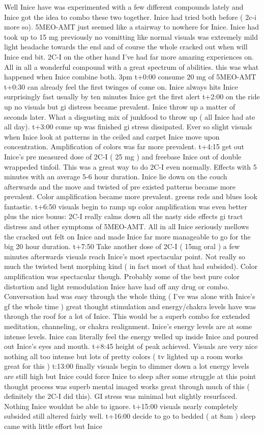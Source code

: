 \documentclass[12pt]{book}
\begin{document}
Well Inice have was experimented with a few different compounds lately and Inice got the idea to combo these two together. Inice had tried both before ( 2c-i more so). 5MEO-AMT just seemed like a stairway to nowhere for Inice. Inice had took up to 15 mg previously no vomitting like normal visuals was extremely mild light headache towards the end and of course the whole cracked out when will Inice end bit. 2C-I on the other hand I've had far more amazing experiences on. All in all a wonderful compound with a great spectrum of abilities. this was what happened when Inice combine both. 3pm t+0:00 consume 20 mg of 5MEO-AMT t+0:30 can already feel the first twinges of come on. Inice always hits Inice surprisingly fast usually by ten minutes Inice get the first alert t+2:00 on the ride up no visuals but gi distress became prevalent. Inice throw up a matter of seconds later. What a disgusting mix of junkfood to throw up ( all Inice had ate all day). t+3:00 come up was finished gi stress dissipated. Ever so slight visuals when Inice look at patterns in the ceiled and carpet Inice move upon concentration. Amplification of colors was far more prevalent. t+4:15 get out Inice's pre measured dose of 2C-I ( 25 mg ) and freebase Inice out of double wrappeded tinfoil. This was a great way to do 2C-I even normally. Effects with 5 minutes with an average 5-6 hour duration. Inice lie down on the couch afterwards and the move and twisted of pre existed patterns became more prevalent. Color amplification became more prevalent. greens reds and blues look fantastic. t+6:50 visuals begin to ramp up color amplification was even better plus the nice bonus: 2C-I really calms down all the nasty side effects gi tract distress and other symptoms of 5MEO-AMT. All in all Inice seriously mellows the cracked out felt on Inice and made Inice far more manageable to go for the big 20 hour duration. t+7:50 Take another dose of 2C-I ( 15mg oral ) a few minutes afterwards visuals reach Inice's most spectacular point. Not really so much the twisted bent morphing kind ( in fact most of that had subsided). Color amplification was spectacular though. Probably some of the best pure color distortion and light remodulation Inice have had off any drug or combo. Conversation had was easy through the whole thing ( I've was alone with Inice's gf the whole time ) great thought stimulation and energy/chakra levels have was through the roof for a lot of Inice. This would be a superb combo for extended meditation, channeling, or chakra realignment. Inice's energy levels are at some intense levels. Inice can literally feel the energy welled up inside Inice and poured out Inice's eyes and mouth. t+8:45 height of peak achieved. Visuals are very nice nothing all too intense but lots of pretty colors ( tv lighted up a room works great for this ) t:13:00 finally visuals begin to dimmer down a lot energy levels are still high but Inice could force Inice to sleep after some struggle at this point thought process was superb mental imaged works great through much of this ( definitely the 2C-I did this). GI stress was minimal but slightly resurfaced. Nothing Inice wouldnt be able to ignore. t+15:00 visuals nearly completely subsided still altered fairly well. t+16:00 decide to go to bedded ( at 8am ) sleep came with little effort but Inice 
\end{document}
